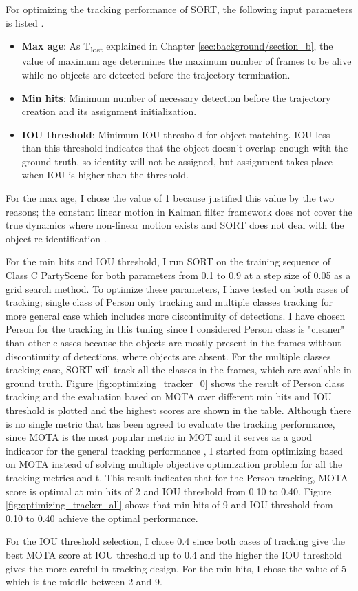 For optimizing the tracking performance of SORT, the following input parameters is listed \cite{bewley_simple_2016}.
\begin{itemize}
    \item \textbf{Max age}: As T\textsubscript{lost} explained in Chapter \ref{sec:background/section_b}, the value of maximum age determines the maximum number of frames to be alive while no objects are detected before the trajectory termination.
    \item \textbf{Min hits}: Minimum number of necessary detection before the trajectory creation and its assignment initialization.
    \item \textbf{IOU threshold}: Minimum IOU threshold for object matching. IOU less than this threshold indicates that the object doesn't overlap enough with the ground truth, so identity will not be assigned, but assignment takes place when IOU is higher than the threshold.
\end{itemize}
For the max age, I chose the value of 1 because \citeauthor{bewley_simple_2016} justified this value by the two reasons; the constant linear motion in Kalman filter framework does not cover the true dynamics where non-linear motion exists and SORT does not deal with the object re-identification \cite{bewley_simple_2016}. 

For the min hits and IOU threshold, I run SORT on the training sequence of Class C PartyScene for both parameters from 0.1 to 0.9 at a step size of 0.05 as a grid search method. To optimize these parameters, I have tested on both cases of tracking; single class of Person only tracking and multiple classes tracking for more general case which includes more discontinuity of detections. I have chosen Person for the tracking in this tuning since I considered Person class is "cleaner" than other classes because the objects are mostly present in the frames without discontinuity of detections, where objects are absent. For the multiple classes tracking case, SORT will track all the classes in the frames, which are available in ground truth. Figure \ref{fig:optimizing_tracker_0} shows the result of Person class tracking and the evaluation based on MOTA over different min hits and IOU threshold is plotted and the highest scores are shown in the table. Although there is no single metric that has been agreed to evaluate the tracking performance, since MOTA is the most popular metric in MOT and it serves as a good indicator for the general tracking performance \cite{bernardin_evaluating_2008} \cite{milan_mot16_2016}, I started from optimizing based on MOTA instead of solving multiple objective optimization problem for all the tracking metrics and t. This result indicates that for the Person tracking, MOTA score is optimal at min hits of 2 and IOU threshold from 0.10 to 0.40. Figure \ref{fig:optimizing_tracker_all} shows that min hits of 9 and IOU threshold from 0.10 to 0.40 achieve the optimal performance.

For the IOU threshold selection, I chose 0.4 since both cases of tracking give the best MOTA score at IOU threshold up to 0.4 and the higher the IOU threshold gives the more careful in tracking design. For the min hits, I chose the value of 5 which is the middle between 2 and 9. 

